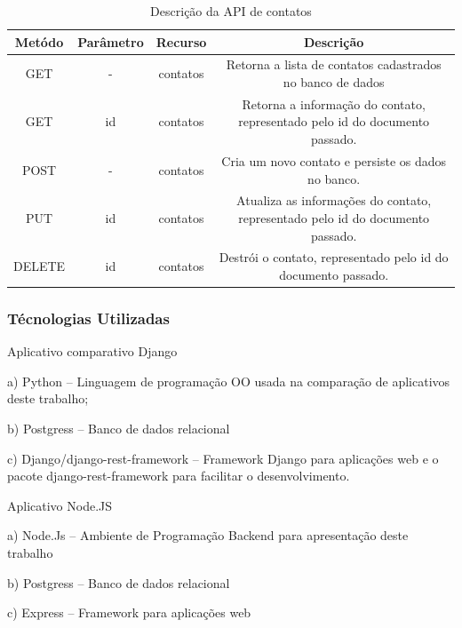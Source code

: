   
  \begin{table}[H]
    \centering
    \footnotesize
    \setlength{\abovecaptionskip}{0pt}
    \setlength{\belowcaptionskip}{0pt}
    \caption[Descrição da API de contatos]{Descrição da API de contatos}
    \label{tab:api-descricao-contato}
    \begin{tabular}{c|c|c|c}
      \hline \hline
      Metódo  &	Parâmetro &	Recurso &	Descrição \\
      \hline \hline
      GET	& -	& contatos	& Retorna a lista de contatos cadastrados no banco de dados \\
      GET	& id	& contatos	& Retorna a informação do contato, representado pelo id do documento passado. \\
      POST	& -	& contatos	& Cria um novo contato e persiste os dados no banco. \\
      PUT	& id	& contatos	& Atualiza as informações do contato, representado pelo id do documento passado. \\
      DELETE	& id	& contatos	& Destrói o contato, representado pelo id do documento passado. \\
      \hline \hline
    \end{tabular}
  \end{table}
  
\subsubsection{Técnologias Utilizadas}


  Aplicativo comparativo Django
    
    \begin{compactitem}
      \item[a)] Python – Linguagem de programação OO usada na comparação de aplicativos deste trabalho;
      \item[b)] Postgress – Banco de dados relacional
      \item[c)] Django/django-rest-framework – Framework Django para aplicações web e o pacote django-rest-framework
      para facilitar o desenvolvimento.
    \end{compactitem}
    
  Aplicativo Node.JS
  
    \begin{compactitem}
      \item[a)] Node.Js – Ambiente de Programação Backend para apresentação deste trabalho
      \item[b)] Postgress – Banco de dados relacional
      \item[c)] Express – Framework para aplicações web
    \end{compactitem}
  

